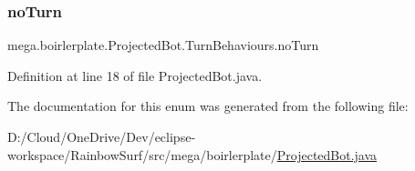 \mbox{\label{enummega_1_1boirlerplate_1_1_projected_bot_1_1_turn_behaviours_a97a519403e1c2eabe8899c82ee8d86f2}} 
\subsubsection{\texorpdfstring{no\+Turn}{noTurn}}
{\footnotesize\ttfamily mega.\+boirlerplate.\+Projected\+Bot.\+Turn\+Behaviours.\+no\+Turn}



Definition at line 18 of file Projected\+Bot.\+java.



The documentation for this enum was generated from the following file\+:\begin{DoxyCompactItemize}
\item 
D\+:/\+Cloud/\+One\+Drive/\+Dev/eclipse-\/workspace/\+Rainbow\+Surf/src/mega/boirlerplate/\hyperlink{_projected_bot_8java}{Projected\+Bot.\+java}\end{DoxyCompactItemize}

